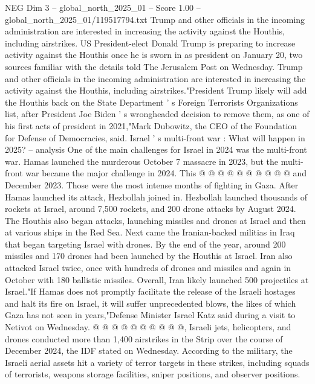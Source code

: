 \begin{textsample}{NEG Dim 3 – global\_north\_2025\_01 – Score 1.00 – global\_north\_2025\_01/119517794.txt}  \label{ex:f3_neg_214}
Trump and other officials in the incoming administration are interested in increasing the activity against the Houthis, including airstrikes.
US President-elect Donald Trump is preparing to increase activity against the Houthis once he is sworn in as president on January 20, two sources familiar with the details told The Jerusalem Post on Wednesday.
Trump and other officials in the incoming administration are interested in increasing the activity against the Houthis, including airstrikes."President Trump likely will add the Houthis back on the State Department ' s Foreign Terrorists Organizations list, after President Joe Biden ' s wrongheaded decision to remove them, as one of his first acts of president in 2021,"Mark Dubowitz, the CEO of the Foundation for Defense of Democracies, said.
Israel ' s multi-front war : What will happen in 2025? -- analysis One of the main challenges for Israel in 2024 was the multi-front war.
Hamas launched the murderous October 7 massacre in 2023, but the multi-front war became the major challenge in 2024.
This @ @ @ @ @ @ @ @ @ @ and December 2023.
Those were the most intense months of fighting in Gaza.
After Hamas launched its attack, Hezbollah joined in.
Hezbollah launched thousands of rockets at Israel, around 7,500 rockets, and 200 drone attacks by August 2024.
The Houthis also began attacks, launching missiles and drones at Israel and then at various ships in the Red Sea.
Next came the Iranian-backed militias in Iraq that began targeting Israel with drones.
By the end of the year, around 200 missiles and 170 drones had been launched by the Houthis at Israel.
Iran also attacked Israel twice, once with hundreds of drones and missiles and again in October with 180 ballistic missiles.
Overall, Iran likely launched 500 projectiles at Israel."If Hamas does not promptly facilitate the release of the Israeli hostages and halt its fire on Israel, it will suffer unprecedented blows, the likes of which Gaza has not seen in years,"Defense Minister Israel Katz said during a visit to Netivot on Wednesday. @ @ @ @ @ @ @ @ @ @, Israeli jets, helicopters, and drones conducted more than 1,400 airstrikes in the Strip over the course of December 2024, the IDF stated on Wednesday.
According to the military, the Israeli aerial assets hit a variety of terror targets in these strikes, including squads of terrorists, weapons storage facilities, sniper positions, and observer positions.

\end{textsample}
